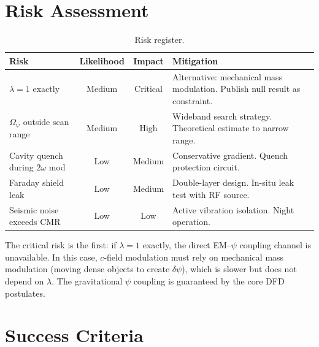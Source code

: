 \documentclass[11pt,letterpaper]{article}
\newcommand{\psifield}{\psi}
\begin{document}
\section{Risk Assessment}
\label{sec:risk}

\begin{table}[H]
\centering
\caption{Risk register.}
\label{tab:risk}
\begin{tabular}{@{}p{3cm}ccp{4.5cm}@{}}
\toprule
Risk & Likelihood & Impact & Mitigation \\
\midrule
$\lambda = 1$ exactly & Medium & Critical &
  Alternative: mechanical mass modulation. Publish null result as
  constraint. \\
$\Omega_\psi$ outside scan range & Medium & High &
  Wideband search strategy. Theoretical estimate to narrow range. \\
Cavity quench during $2\omega$ mod & Low & Medium &
  Conservative gradient. Quench protection circuit. \\
Faraday shield leak & Low & Medium &
  Double-layer design. In-situ leak test with RF source. \\
Seismic noise exceeds CMR & Low & Low &
  Active vibration isolation. Night operation. \\
\bottomrule
\end{tabular}
\end{table}

The critical risk is the first: if $\lambda = 1$ exactly, the
direct EM--$\psifield$ coupling channel is unavailable. In this
case, $c$-field modulation must rely on mechanical mass modulation
(moving dense objects to create $\delta\psifield$), which is
slower but does not depend on $\lambda$. The gravitational
$\psifield$ coupling is guaranteed by the core DFD postulates.

\section{Success Criteria}
\label{sec:success}
\end{document}
